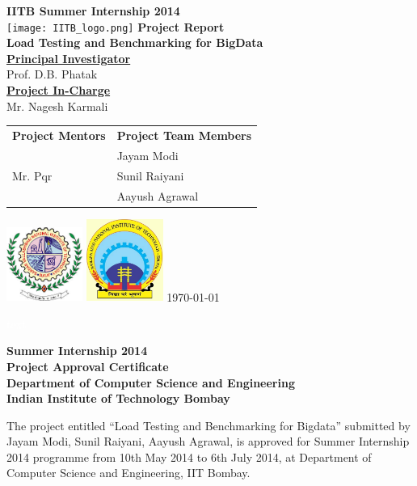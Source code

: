 \documentclass[12pt]{book}
\begin{document}
\begin{titlepage}
 \begin{center}
\Huge
\textbf{IITB Summer Internship 2014} \\
\vfill
\texttt{[image: IITB\_logo.png]}
\vfill
\Huge
\textbf{Project Report}\\
\vfill
\textbf{Load Testing and Benchmarking for BigData}\\
\vfill
\LARGE
\underline{\textbf{Principal Investigator}} \\
Prof. D.B. Phatak\\
\vfill
\LARGE
\underline{\textbf{Project In-Charge}} \\
Mr. Nagesh Karmali\\
\vfill
\Large

\begin{tabular}{l|l}
\textbf{Project Mentors} & \textbf{Project Team Members} \\
 & Jayam Modi \\
Mr. Pqr & Sunil Raiyani \\ 
 & Aayush Agrawal\\
\end{tabular}
\vfill
\includegraphics[width=2.5cm]{svnit.jpg} \hfill
\includegraphics[width=2.5cm]{manit.jpg} \hfill
\vfill
\today
\end{center}
\end{titlepage}

 \pagebreak \textcolor{white}{text} \pagebreak
\thispagestyle{empty}

\begin{center}
\thispagestyle{empty}
\LARGE
\textbf{Summer Internship 2014 \\ Project Approval Certificate} \\
\vskip12pt
\Large
\textbf{Department of Computer Science and Engineering} \\
\vskip5pt
\textbf{Indian Institute of Technology Bombay} \\
\end{center}
\vfill
\normalsize
The project entitled ``Load Testing and Benchmarking for Bigdata'' submitted by Jayam Modi, Sunil Raiyani, Aayush Agrawal,  is approved 
for Summer Internship 2014 programme from 10th May 2014 to 6th July 2014, at Department of Computer Science and Engineering, IIT Bombay.
\end{document}
